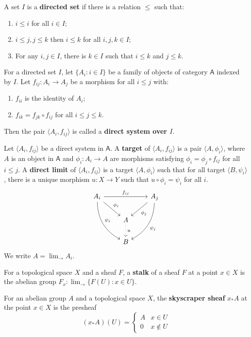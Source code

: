 \begin{defn} A set $I$ is a \textbf{directed set} if there is a relation $\leq$ such that:
\begin{enumerate}
\item $i\leq i$ for all $i\in I$;
\item $i\leq j, j\leq k$ then $i\leq k$ for all $i,j,k\in I$;
\item For any $i,j\in I$, there is $k\in I$ such that $i\leq k$ and $j\leq k$.
\end{enumerate}
For a directed set $I$, let $\{A_i:i\in I\}$ be a family of objects of category $\mathsf{A}$ indexed by $I$. Let $f_{ij}:A_i\rightarrow A_j$ be a morphism for all $i\leq j$ with:
\begin{enumerate}
\item $f_{ii}$ is the identity of $A_i$;
\item $f_{ik}=f_{jk}\circ f_{ij}$ for all $i\leq j\leq k$.
\end{enumerate}
Then the pair $\langle A_i,f_{ij}\rangle$ is called a \textbf{direct system over $I$}.

Let $\langle A_i,f_{ij}\rangle$ be a direct system in $\mathsf{A}$. A \textbf{target} of $\langle A_i,f_{ij}\rangle$ is a pair $\langle A,\phi_i\rangle$, where $A$ is an object in $\mathsf{A}$ and $\phi_i:A_i\rightarrow A$ are morphisms satisfying $\phi_i=\phi_j\circ f_{ij}$ for all $i\leq j$. A \textbf{direct limit} of $\langle A_i,f_{ij}\rangle$ is a target $\langle A,\phi_i\rangle$ such that for all target $\langle B,\psi_i\rangle$, there is a unique morphism $u:X\rightarrow Y$ such that $u\circ \phi_i=\psi_i$ for all $i$.
\begin{equation}
\begin{tikzcd}
A_i\arrow{rr}{f_{ij}} \arrow{rd}{\phi_i} \arrow[rdd, bend right,"\psi_i"]&&A_j\arrow{ld}{\phi_j}\arrow[ldd, bend left,"\psi_j"]\\
&A\arrow[d, dotted,"u"]&\\
&B&
\end{tikzcd}
\end{equation}
We write $A=\lim_{\rightarrow} A_i$.
\end{defn}

\begin{defn} For a topological space $X$ and a sheaf $F$, a \textbf{stalk} of a sheaf $F$ at a point $x\in X$ is the abelian group $F_x:\lim_{\rightarrow}\{F(U):x\in U\}$.
\end{defn}

\begin{defn} For an abelian group $A$ and a topological space $X$, the \textbf{skyscraper sheaf} $x_*A$ at the point $x\in X$ is the presheaf
\begin{equation}
(x_* A)(U)=\begin{cases}
A&x\in U\\
0&x\notin U
\end{cases}
\end{equation}
\end{defn}

